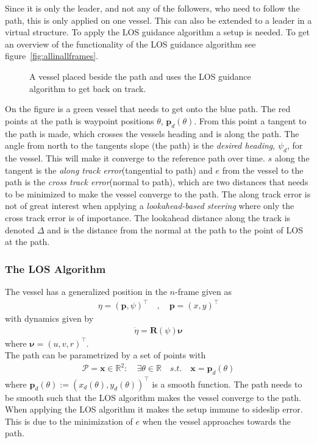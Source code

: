 Since it is only the leader, and not any of the followers, who need to follow the path, this is only applied on one vessel. This can also be extended to a leader in a virtual structure. To apply the \ac{LOS} guidance algorithm a setup is needed. To get an overview of the functionality of the \ac{LOS} guidance algorithm see figure~\vref{fig:allinallframes}.
\begin{figure}[htbp]
	\centering
	
	\caption{A vessel placed beside the path and uses the \ac{LOS} guidance algorithm to get back on track.}
	\label{fig:allinallframes}
\end{figure}
On the figure is a green vessel that needs to get onto the blue path. The red points at the path is waypoint positions $\theta$, $\textbf{p}_d(\theta)$. From this point a tangent to the path is made, which crosses the vessels heading and is along the path. The angle from north to the tangents slope (the path) is the \textit{desired heading}, $\psi_d$, for the vessel. This will make it converge to the reference path over time. $s$ along the tangent is the \textit{along track error}(tangential to path) and $e$ from the vessel to the path is the \textit{cross track error}(normal to path), which are two distances that needs to be minimized to make the vessel converge to the path. The along track error is not of great interest when applying a \textit{lookahead-based steering} where only the cross track error is of importance. The lookahead distance along the track is denoted $\Delta$ and is the distance from the normal at the path to the point of \ac{LOS} at the path.

\subsubsection{The \ac{LOS} Algorithm}
The vessel has a generalized position in the ${n}$-frame given as
\begin{align}
\eta = (\textbf{p},\psi)^\top\quad , \quad \textbf{p} = (x,y)^\top
\end{align}
with dynamics given by
\begin{align}
\dot{\eta} = \textbf{R}(\psi)\boldsymbol{\nu}
\end{align}
where $\boldsymbol{\nu} = (u,v,r)^\top$.\\
The path can be parametrized by a set of points with
\begin{align}
\mathcal{P} = {\textbf{x}}\in\mathds{R}^2 : \quad \exists \theta \in \mathds{R} \quad s.t. \quad \textbf{x} = \textbf{p}_d(\theta)
\end{align}
where $\textbf{p}_d(\theta) := (x_d(\theta),y_d(\theta))^\top$ is a smooth function. The path needs to be smooth such that the \ac{LOS} algorithm makes the vessel converge to the path. When applying the \ac{LOS} algorithm it makes the setup immune to sideslip error. This is due to the minimization of $e$ when the vessel approaches towards the path.

